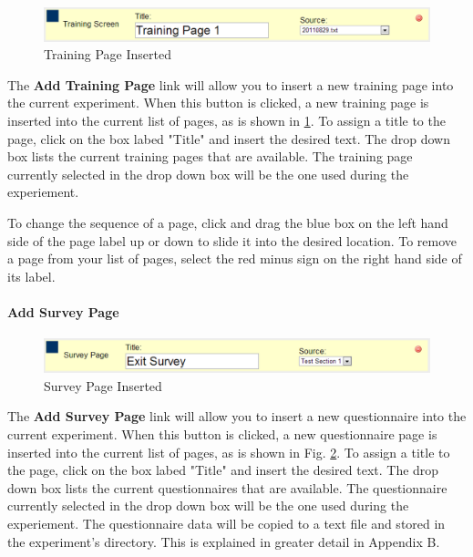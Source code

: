 \documentclass[article]{ij4uq}              %
\begin{document}
\begin{figure}[h!]
 \centering
 \includegraphics[width=5.0in]{figures/add_training.png}
 \caption{Training Page Inserted}
 \label{fig:trainInsert}
\end{figure}
\FloatBarrier

The \textbf{Add Training Page} link will allow you to insert a new training page into the current experiment. When this button is clicked, a new training page is inserted into the current list of pages, as is shown in \ref{fig:trainInsert}.  To assign a title to the page, click on the box labed "Title" and insert the desired text.  The drop down box lists the current training pages that are available.  The training page currently selected in the drop down box will be the one used during the experiement.

To change the sequence of a page, click and drag the blue box on the left hand side of the page label up or down to slide it into the desired location. To remove a page from your list of pages, select the red minus sign on the right hand side of its label.

\paragraph{Add Survey Page}

\begin{figure}[h!]
 \centering
 \includegraphics[width=5.0in]{figures/add_survey.png}
 \caption{Survey Page Inserted}
 \label{fig:surveyInsert}
\end{figure}
\FloatBarrier

The \textbf{Add Survey Page} link will allow you to insert a new questionnaire into the current experiment. When this button is clicked, a new questionnaire page is inserted into the current list of pages, as is shown in Fig. \ref{fig:surveyInsert}.   To assign a title to the page, click on the box labed "Title" and insert the desired text.  The drop down box lists the current questionnaires  that are available.  The questionnaire currently selected in the drop down box will be the one used during the experiement.  The questionnaire data will be copied to a text file and stored in the experiment's directory.  This is explained in greater detail in Appendix B.
\end{document}
